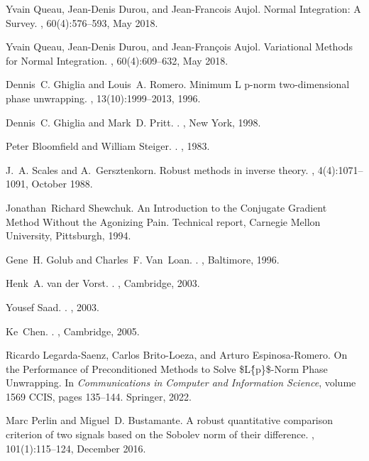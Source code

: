 \documentclass[12pt,letterpaper]{article}
\begin{document}
\begin{thebibliography}{10}
	Yvain Queau, Jean-Denis Durou, and Jean-Francois Aujol.
	\newblock Normal {{Integration}}: {{A Survey}}.
	, 60(4):576--593, May
	2018.
	
	Yvain Queau, Jean-Denis Durou, and Jean-Fran{\c c}ois Aujol.
	\newblock Variational {{Methods}} for {{Normal Integration}}.
	, 60(4):609--632, May
	2018.
	
	Dennis~C. Ghiglia and Louis~A. Romero.
	\newblock Minimum {{L}} p-norm two-dimensional phase unwrapping.
	, 13(10):1999--2013,
	1996.
	
	Dennis~C. Ghiglia and Mark~D. Pritt.
	.
	, {New York}, 1998.
	
	Peter Bloomfield and William Steiger.
	.
	, 1983.
	
	J.~A. Scales and A.~Gersztenkorn.
	\newblock Robust methods in inverse theory.
	, 4(4):1071--1091, October 1988.
	
	Jonathan~Richard Shewchuk.
	\newblock An {{Introduction}} to the {{Conjugate Gradient Method Without}} the
	{{Agonizing Pain}}.
	\newblock Technical report, {Carnegie Mellon University}, {Pittsburgh}, 1994.
	
	Gene~H. Golub and Charles~F. Van~Loan.
	.
	, {Baltimore}, 1996.
	
	Henk~A. {van der Vorst}.
	.
	, {Cambridge}, 2003.
	
	Yousef Saad.
	.
	, 2003.
	
	Ke~Chen.
	.
	, {Cambridge}, 2005.
	
	Ricardo {Legarda-Saenz}, Carlos {Brito-Loeza}, and Arturo {Espinosa-Romero}.
	\newblock On the {{Performance}} of {{Preconditioned Methods}} to {{Solve}}
	\${{L}}\^\{p\}\$-{{Norm Phase Unwrapping}}.
	\newblock In {\em Communications in {{Computer}} and {{Information Science}}},
	volume 1569 CCIS, pages 135--144. {Springer}, 2022.
	
	Marc Perlin and Miguel~D. Bustamante.
	\newblock A robust quantitative comparison criterion of two signals based on
	the {{Sobolev}} norm of their difference.
	, 101(1):115--124, December
	2016.
\end{thebibliography}
\end{document}
